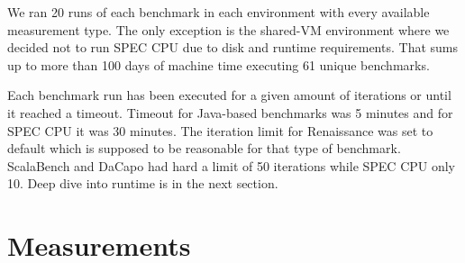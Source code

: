 \begin{table}[ht]
  \centering
  \caption{Summary of selected platforms.}
  \label{table:envs}
\end{table}

We ran 20 runs of each benchmark in each environment with every available measurement type.
The only exception is the \mbox{shared-VM} environment where we decided not to run SPEC CPU due to disk and runtime requirements.
That sums up to more than 100 days of machine time executing 61 unique benchmarks.

Each benchmark run has been executed for a given amount of iterations or until it reached a timeout.
Timeout for \mbox{Java-based} benchmarks was 5 minutes and for SPEC CPU it was 30 minutes.
The iteration limit for Renaissance was set to default which is supposed to be reasonable for that type of benchmark.
ScalaBench and DaCapo had hard a limit of 50 iterations while SPEC CPU only 10.
Deep dive into runtime is in the next section.

\section{Measurements}
\label{sec:measurements}


